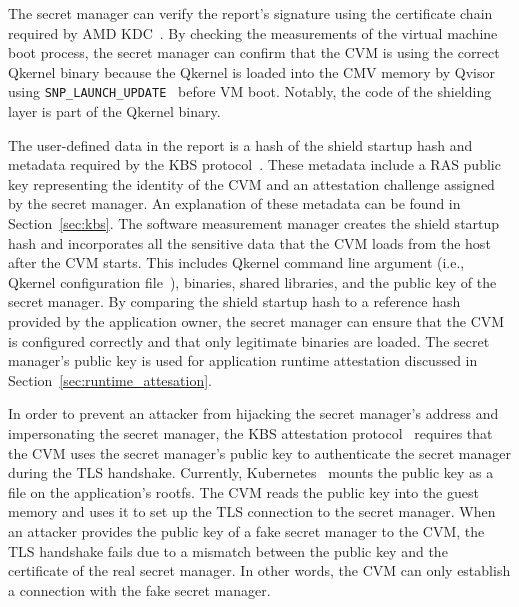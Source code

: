 The secret manager can verify the report's signature using the certificate chain required by AMD KDC~\cite*{snp_kdc}. By checking the measurements of the virtual machine boot process, the secret manager can confirm that the CVM is using the correct Qkernel binary because the Qkernel is loaded into the CMV memory by Qvisor using 
\texttt{SNP\_LAUNCH\_UPDATE}~\cite*{snp_firmware} before VM boot. Notably, the code of the shielding layer is part of the Qkernel binary.

The user-defined data in the report is a hash of the shield startup hash and metadata required by the KBS protocol~\cite*{kbs_Attestation_protocol}. These metadata include a RAS public key representing the identity of the \acrshort{CVM} and an attestation challenge assigned by the secret manager. An explanation of these metadata can be found in Section~\ref{sec:kbs}. The software measurement 
manager creates the shield startup hash and incorporates all the sensitive data that the \acrshort{CVM} loads from the host after the \acrshort{CVM} starts. This includes Qkernel command line argument (i.e., Qkernel configuration file~\cite*{quark_conf_file}), binaries, shared libraries, and the public key of the secret manager. By comparing the shield startup hash
to a reference hash provided by the application owner, the secret manager can ensure that the \acrshort{CVM} is configured correctly and that only legitimate binaries are loaded. The secret manager's public key is used for application runtime attestation discussed in Section~\ref{sec:runtime_attesation}.

In order to prevent an attacker from hijacking the secret manager's address and impersonating the secret manager, the KBS attestation protocol~\cite*{kbs_Attestation_protocol} requires that the CVM uses the secret manager's public key to authenticate the secret manager during the TLS handshake. Currently, Kubernetes~\cite*{k8s} mounts the public key as a file on 
the application's rootfs. The \acrshort{CVM} reads the public key into the guest memory and uses it to set up the TLS connection to the secret manager. When an attacker provides the public key of a fake secret manager to the \acrshort{CVM}, the TLS handshake fails due to a mismatch between the public key and the certificate of the real secret manager. In other words, the 
\acrshort{CVM} can only establish a connection with the fake secret manager.



